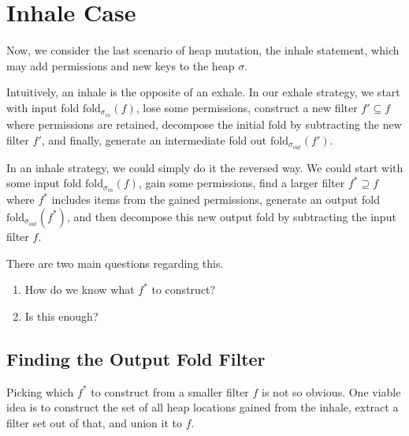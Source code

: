 \documentclass[msc,oneside]{ubcthesis}
\theoremstyle{definition}
\begin{document}
\section{Inhale Case}
Now, we consider the last scenario of heap mutation, the inhale statement, which may add permissions and new keys to the heap $\sigma$. 

Intuitively, an inhale is the opposite of an exhale. In our exhale strategy, we start with input fold $\textrm{fold}_{\sigma_{in}}(f)$, lose some permissions, construct a new filter $f' \subseteq f$ where permissions are retained, decompose the initial fold by subtracting the new filter $f'$, and finally, generate an intermediate fold out $\textrm{fold}_{\sigma_{out}}(f')$. 

In an inhale strategy, we could simply do it the reversed way. We could start with some input fold $\textrm{fold}_{\sigma_{in}}(f)$, gain some permissions, find a larger filter $f^* \supseteq f$ where $f^*$ includes items from the gained permissions, generate an output fold $\textrm{fold}_{\sigma_{out}}(f^*)$, and then decompose this new output fold by subtracting the input filter $f$.

There are two main questions regarding this.
\begin{enumerate}
    \item How do we know what $f^*$ to construct?
    \item Is this enough?
\end{enumerate}

\subsection{Finding the Output Fold Filter}
Picking which $f^*$ to construct from a smaller filter $f$ is not so obvious. One viable idea is to construct the set of all heap locations gained from the inhale, extract a filter set out of that, and union it to $f$. 
\end{document}
